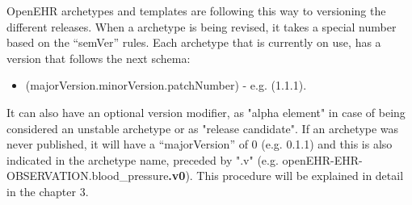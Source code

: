 \documentclass[mim_thesis.tex]{subfiles}
\begin{document}
OpenEHR archetypes and templates are following this way to versioning the different releases. When a archetype is being revised, it takes a special number based on the “semVer” rules. Each archetype that is currently on use, has a version that follows the next schema:
\begin{itemize} [noitemsep]
\item (majorVersion.minorVersion.patchNumber) - e.g. (1.1.1).
\end{itemize}

It can also have an optional version modifier, as "alpha element" in case of being considered an unstable archetype or as "release candidate". If an archetype was never published, it will have a “majorVersion” of 0 (e.g. 0.1.1) and this is also indicated in the archetype name, preceded by ".v" (e.g. openEHR-EHR-OBSERVATION.blood\_pressure\textbf{.v0}). This procedure will be explained in detail in the chapter 3.  


\newpage
\end{document}
